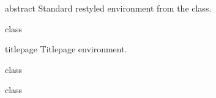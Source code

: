 \documentclass{skdoc}
\begin{document}
	\begin{environment}{abstract}
	Standard restyled  environment from the
	 class.
\begin{MacroCode}{class}
\newenvironment{abstract}{\newlength\skrapport@abstract@tw\newlength\skrapport@abstract@aw\settowidth{\skrapport@abstract@tw}{\bfseries\abstractname}\setlength{\skrapport@abstract@aw}{\the\textwidth-\the\skrapport@abstract@tw-1em}\begin{minipage}[t]{\skrapport@abstract@tw}\begin{flushright}\bfseries\abstractname\end{flushright}\end{minipage}\hspace{1em}\begin{minipage}[t]{\skrapport@abstract@aw}}{\end{minipage}}
\end{MacroCode}
	\end{environment}

	\begin{environment}{titlepage}
	Titlepage environment.
	\begin{macro*}{\ps@skrapport@titlepage}
\begin{MacroCode}{class}
\newcommand\ps@skrapport@titlepage{\def\@oddhead{}\def\@evenhead{}\def\@oddfoot{\begin{minipage}{\textwidth}\raggedleft\small\par\@smallprintstyle\@copyright\end{minipage}}\let\@evenfoot\@oddfoot}
\end{MacroCode}
	\end{macro*}
\begin{MacroCode}{class}
\newenvironment{titlepage}{\cleardoublepage\setcounter{page}\@ne}{\thispagestyle{skrapport@titlepage}\cleardoublepage\setcounter{page}\@ne}
\end{MacroCode}
	\end{environment}
\end{document}
